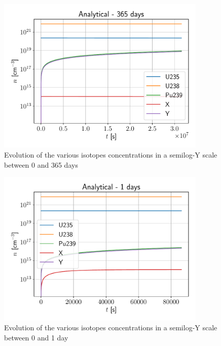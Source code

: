 \documentclass[11pt,a4paper]{article}
\begin{document}
\begin{figure}[H]
	\includegraphics[width=10cm]{fig/Ex5_analytic_365_day.pdf}
	\centering
	\caption{Evolution of the various isotopes concentrations in a semilog-Y scale between 0 and 365 days}
\end{figure}
\begin{figure}[H]
	\includegraphics[width=10cm]{fig/Ex5_analytic_1_day.pdf}
	\centering
	\caption{Evolution of the various isotopes concentrations in a semilog-Y scale between 0 and 1 day}
\end{figure}
\end{document}
